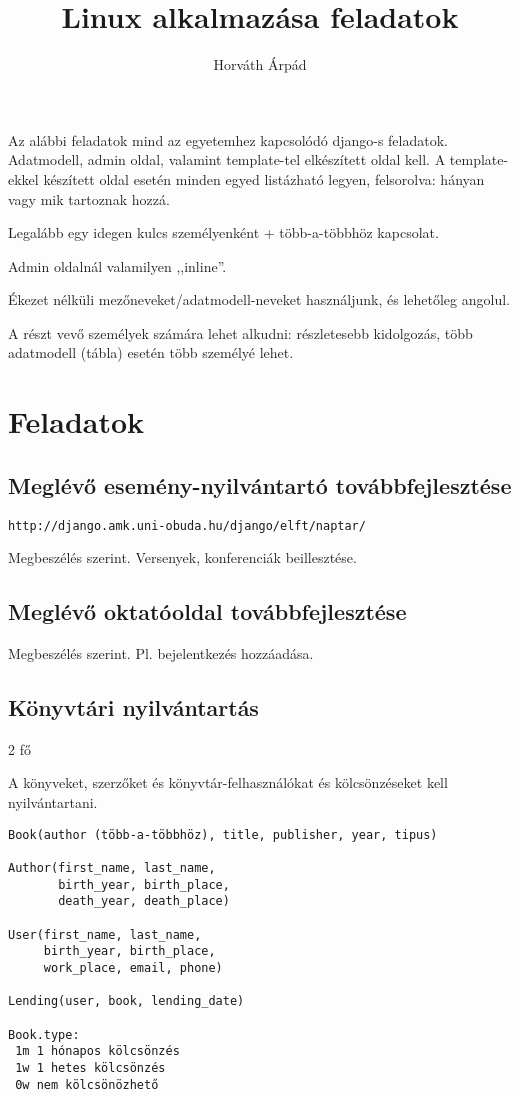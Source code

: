 \documentclass[a4paper]{article}
\begin{document}
\title{Linux alkalmazása feladatok}
\author{Horváth Árpád}
\maketitle

Az alábbi feladatok mind az egyetemhez kapcsolódó django-s feladatok.
Adatmodell, admin oldal, valamint template-tel elkészített oldal kell.
A template-ekkel készített oldal esetén minden egyed listázható legyen,
felsorolva: hányan vagy mik tartoznak hozzá.

Legalább egy idegen kulcs személyenként + több-a-többhöz kapcsolat.

Admin oldalnál valamilyen ,,inline''.

Ékezet nélküli mezőneveket/adatmodell-neveket használjunk, és lehetőleg angolul.

A részt vevő személyek számára lehet alkudni: részletesebb kidolgozás,
több adatmodell (tábla) esetén több személyé lehet.

\section{Feladatok}

\subsection{Meglévő esemény-nyilvántartó továbbfejlesztése}

\verb!http://django.amk.uni-obuda.hu/django/elft/naptar/!

Megbeszélés szerint. Versenyek, konferenciák beillesztése.

\subsection{Meglévő oktatóoldal továbbfejlesztése}

Megbeszélés szerint. Pl. bejelentkezés hozzáadása.

\subsection{Könyvtári nyilvántartás}

2 fő

A könyveket, szerzőket és könyvtár-felhasználókat és kölcsönzéseket kell
nyilvántartani.


\begin{verbatim}
Book(author (több-a-többhöz), title, publisher, year, tipus)

Author(first_name, last_name,
       birth_year, birth_place,
       death_year, death_place)

User(first_name, last_name,
     birth_year, birth_place,
     work_place, email, phone)

Lending(user, book, lending_date)

Book.type:
 1m 1 hónapos kölcsönzés
 1w 1 hetes kölcsönzés
 0w nem kölcsönözhető
\end{verbatim}
\end{document}
